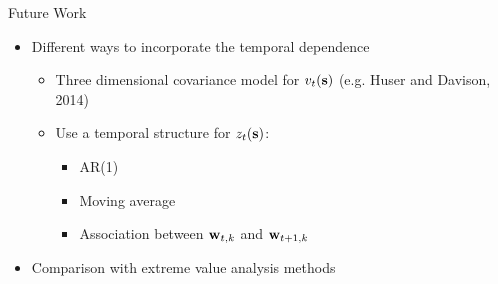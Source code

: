 \documentclass{beamer}
\begin{document}




\begin{frame}{Future Work}
  \begin{itemize} \setlength{\itemsep}{0.5em}
    \item Different ways to incorporate the temporal dependence
    \begin{itemize}
    	\item Three dimensional covariance model for $v_t(\mbox{\bf s})$ (e.g. Huser and Davison, 2014)
    	\item Use a temporal structure for $z_t(\mbox{\bf s})$:
	\begin{itemize}
		\item AR(1)
		\item Moving average
		\item Association between $\mbox{\bf w}_{t, k}$ and $\mbox{\bf w}_{t+1, k}$
	\end{itemize}
    \end{itemize}
     \item Comparison with extreme value analysis methods
  \end{itemize}
\end{frame}
\end{document}
